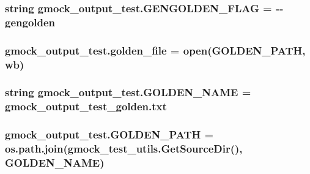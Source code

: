 \subsubsection[{\texorpdfstring{G\+E\+N\+G\+O\+L\+D\+E\+N\+\_\+\+F\+L\+AG}{GENGOLDEN_FLAG}}]{\setlength{\rightskip}{0pt plus 5cm}string gmock\+\_\+output\+\_\+test.\+G\+E\+N\+G\+O\+L\+D\+E\+N\+\_\+\+F\+L\+AG = \textquotesingle{}-\/-\/gengolden\textquotesingle{}}\hypertarget{namespacegmock__output__test_a0bd3131fe8262154217588fed6b28d45}{}\label{namespacegmock__output__test_a0bd3131fe8262154217588fed6b28d45}
\subsubsection[{\texorpdfstring{golden\+\_\+file}{golden_file}}]{\setlength{\rightskip}{0pt plus 5cm}gmock\+\_\+output\+\_\+test.\+golden\+\_\+file = open({\bf G\+O\+L\+D\+E\+N\+\_\+\+P\+A\+TH}, \textquotesingle{}wb\textquotesingle{})}\hypertarget{namespacegmock__output__test_aa592d26826a4dabf494fc2dd3c5c8b1e}{}\label{namespacegmock__output__test_aa592d26826a4dabf494fc2dd3c5c8b1e}
\subsubsection[{\texorpdfstring{G\+O\+L\+D\+E\+N\+\_\+\+N\+A\+ME}{GOLDEN_NAME}}]{\setlength{\rightskip}{0pt plus 5cm}string gmock\+\_\+output\+\_\+test.\+G\+O\+L\+D\+E\+N\+\_\+\+N\+A\+ME = \textquotesingle{}gmock\+\_\+output\+\_\+test\+\_\+golden.\+txt\textquotesingle{}}\hypertarget{namespacegmock__output__test_ac6e9298ea3967e6fa704c9c246d6cc18}{}\label{namespacegmock__output__test_ac6e9298ea3967e6fa704c9c246d6cc18}
\subsubsection[{\texorpdfstring{G\+O\+L\+D\+E\+N\+\_\+\+P\+A\+TH}{GOLDEN_PATH}}]{\setlength{\rightskip}{0pt plus 5cm}gmock\+\_\+output\+\_\+test.\+G\+O\+L\+D\+E\+N\+\_\+\+P\+A\+TH = os.\+path.\+join({\bf gmock\+\_\+test\+\_\+utils.\+Get\+Source\+Dir}(), {\bf G\+O\+L\+D\+E\+N\+\_\+\+N\+A\+ME})}\hypertarget{namespacegmock__output__test_a632c0fbf08500e4ed3c0e33f5e2ac771}{}\label{namespacegmock__output__test_a632c0fbf08500e4ed3c0e33f5e2ac771}
